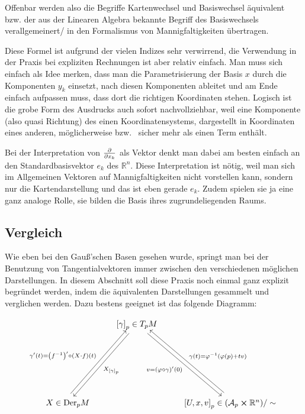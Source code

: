 \documentclass[../H_Analysis_main.tex]{subfiles}
\begin{document}
\begin{bsp}
Offenbar werden also die Begriffe Kartenwechsel und Basiswechsel äquivalent bzw. der aus der Linearen Algebra bekannte Begriff des Basiswechsels verallgemeinert/ in den Formalismus von Mannigfaltigkeiten übertragen.
\end{bsp}

Diese Formel ist aufgrund der vielen Indizes sehr verwirrend, die Verwendung in der Praxis bei expliziten Rechnungen ist aber relativ einfach. Man muss sich einfach als Idee merken, dass man die Parametrisierung der Basis $x$ durch die Komponenten $y_k$ einsetzt, nach diesen Komponenten ableitet und am Ende einfach aufpassen muss, dass dort die richtigen Koordinaten stehen.  Logisch ist die grobe Form des Ausdrucks auch sofort nachvollziehbar, weil eine Komponente (also quasi Richtung) des einen Koordinatensystems, dargestellt in Koordinaten eines anderen, möglicherweise bzw.~ sicher mehr als einen Term enthält.

Bei der Interpretation von $\pdv{x_k}$ als Vektor denkt man dabei am besten einfach an den Standardbasisvektor $e_k$ des $\mathbb{R}^n$. Diese Interpretation ist nötig, weil man sich im Allgemeinen Vektoren auf Mannigfaltigkeiten nicht vorstellen kann, sondern nur die Kartendarstellung und das ist eben gerade $e_k$. Zudem spielen sie ja eine ganz analoge Rolle, sie bilden die Basis ihres zugrundeliegenden Raums.



		\subsection{Vergleich}
Wie eben bei den Gauß'schen Basen gesehen wurde, springt man bei der Benutzung von Tangentialvektoren immer zwischen den verschiedenen möglichen Darstellungen. In diesem Abschnitt soll diese Praxis noch einmal ganz explizit begründet werden, indem die äquivalenten Darstellungen gesammelt und verglichen werden. Dazu bestens geeignet ist das folgende Diagramm:

$$
\begin{tikzcd}[row sep = 76, column sep = 24]%
 & \arrow{dl}{X_{\qty[\gamma]_p}} \qty[\gamma]_p \in T_p M \arrow[swap]{dr}{v = \qty(\varphi \circ \gamma)'(0)} &  \\
X \in \text{Der}_p M \arrow[shift left = 0.5em]{ur}{\gamma'(t) = \qty(f^{-1})' \circ \qty(X \cdot f)(t)}%
 & & \qty[U, x, v]_p \in \qty(\mathcal{A}_p \cross \mathbb{R}^n)/\sim \arrow[swap, shift right = 0.5em]{ul}{\gamma(t) = \varphi^{-1}\qty(\varphi(p) + t v)}
\end{tikzcd}
$$
\end{document}
